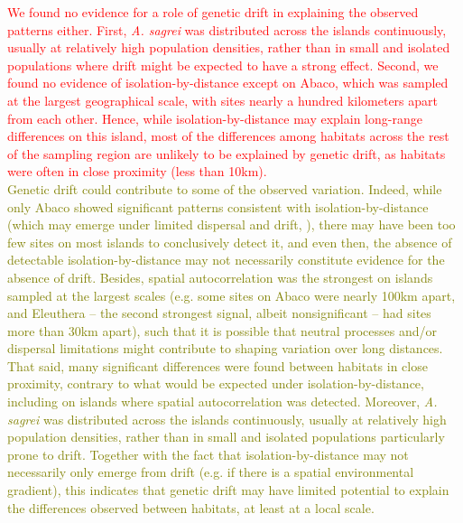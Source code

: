 \textcolor{red}{We found no evidence for a role of genetic drift in explaining the observed patterns either. First, \textit{A. sagrei} was distributed across the islands continuously, usually at relatively high population densities, rather than in small and isolated populations where drift might be expected to have a strong effect. Second, we found no evidence of isolation-by-distance except on Abaco, which was sampled at the largest geographical scale, with sites nearly a hundred kilometers apart from each other. Hence, while isolation-by-distance may explain long-range differences on this island, most of the differences among habitats across the rest of the sampling region are unlikely to be explained by genetic drift, as habitats were often in close proximity (less than 10km).}\\

\textcolor{olive}{Genetic drift could contribute to some of the observed variation. Indeed, while only Abaco showed significant patterns consistent with isolation-by-distance (which may emerge under limited dispersal and drift, \citealt{Wright1943, Kimura1964, Slatkin1987}), there may have been too few sites on most islands to conclusively detect it, and even then, the absence of detectable isolation-by-distance may not necessarily constitute evidence for the absence of drift. Besides, spatial autocorrelation was the strongest on islands sampled at the largest scales (e.g. some sites on Abaco were nearly 100km apart, and Eleuthera -- the second strongest signal, albeit nonsignificant -- had sites more than 30km apart), such that it is possible that neutral processes and/or dispersal limitations might contribute to shaping variation over long distances. That said, many significant differences were found between habitats in close proximity, contrary to what would be expected under isolation-by-distance, including on islands where spatial autocorrelation was detected. Moreover, \textit{A. sagrei} was distributed across the islands continuously, usually at relatively high population densities, rather than in small and isolated populations particularly prone to drift. Together with the fact that isolation-by-distance may not necessarily only emerge from drift (e.g. if there is a spatial environmental gradient), this indicates that genetic drift may have limited potential to explain the differences observed between habitats, at least at a local scale.}\\

